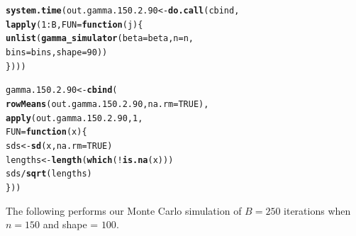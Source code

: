 \documentclass[11pt]{article}\usepackage[]{graphicx}\usepackage[]{color}
\makeatletter
\newcommand{\hlnum}[1]{\textcolor[rgb]{0.686,0.059,0.569}{#1}}%
\newcommand{\hlopt}[1]{\textcolor[rgb]{0,0,0}{#1}}%
\newcommand{\hlstd}[1]{\textcolor[rgb]{0.345,0.345,0.345}{#1}}%
\newcommand{\hlkwa}[1]{\textcolor[rgb]{0.161,0.373,0.58}{\textbf{#1}}}%
\newcommand{\hlkwb}[1]{\textcolor[rgb]{0.69,0.353,0.396}{#1}}%
\newcommand{\hlkwc}[1]{\textcolor[rgb]{0.333,0.667,0.333}{#1}}%
\newcommand{\hlkwd}[1]{\textcolor[rgb]{0.737,0.353,0.396}{\textbf{#1}}}%
\newenvironment{kframe}{%
 \def\at@end@of@kframe{}%
 \ifinner\ifhmode%
  \def\at@end@of@kframe{\end{minipage}}%
  \begin{minipage}{\columnwidth}%
 \fi\fi%
 \def\FrameCommand##1{\hskip\@totalleftmargin \hskip-\fboxsep
 \colorbox{shadecolor}{##1}\hskip-\fboxsep
     \hskip-\linewidth \hskip-\@totalleftmargin \hskip\columnwidth}%
 \MakeFramed {\advance\hsize-\width
   \@totalleftmargin\z@ \linewidth\hsize
   \@setminipage}}%
 {\par\unskip\endMakeFramed%
 \at@end@of@kframe}
\newenvironment{knitrout}{}{} %
\makeatother
\begin{document}
\begin{knitrout}
\color{fgcolor}\begin{kframe}
\begin{alltt}
\hlkwd{system.time}\hlstd{(out.gamma.150.2.90} \hlkwb{<-} \hlkwd{do.call}\hlstd{(cbind,}
  \hlkwd{lapply}\hlstd{(}\hlnum{1}\hlopt{:}\hlstd{B,} \hlkwc{FUN} \hlstd{=} \hlkwa{function}\hlstd{(}\hlkwc{j}\hlstd{)\{}
    \hlkwd{unlist}\hlstd{(}\hlkwd{gamma_simulator}\hlstd{(}\hlkwc{beta} \hlstd{= beta,} \hlkwc{n} \hlstd{= n,}
      \hlkwc{bins} \hlstd{= bins,} \hlkwc{shape} \hlstd{=} \hlnum{90}\hlstd{))}
\hlstd{\})))}
\end{alltt}


{\ttfamily\noindent\bfseries\color{errorcolor}{\#\# Error in eval(family\$initialize): non-positive values not allowed for the 'gamma' family}}

{\ttfamily\noindent\itshape\color{messagecolor}{\#\# Timing stopped at: 0.007 0 0.007}}\end{kframe}
\end{knitrout}

\begin{knitrout}
\color{fgcolor}\begin{kframe}
\begin{alltt}
\hlstd{gamma.150.2.90} \hlkwb{<-} \hlkwd{cbind}\hlstd{(}
  \hlkwd{rowMeans}\hlstd{(out.gamma.150.2.90,} \hlkwc{na.rm} \hlstd{=} \hlnum{TRUE}\hlstd{),}
  \hlkwd{apply}\hlstd{(out.gamma.150.2.90,} \hlnum{1}\hlstd{,}
  \hlkwc{FUN} \hlstd{=} \hlkwa{function}\hlstd{(}\hlkwc{x}\hlstd{)\{}
    \hlstd{sds} \hlkwb{<-} \hlkwd{sd}\hlstd{(x,} \hlkwc{na.rm} \hlstd{=} \hlnum{TRUE}\hlstd{)}
    \hlstd{lengths} \hlkwb{<-} \hlkwd{length}\hlstd{(}\hlkwd{which}\hlstd{(}\hlopt{!}\hlkwd{is.na}\hlstd{(x)))}
    \hlstd{sds} \hlopt{/} \hlkwd{sqrt}\hlstd{(lengths)}
  \hlstd{\}))}
\end{alltt}


{\ttfamily\noindent\bfseries\color{errorcolor}{\#\# Error in is.data.frame(x): object 'out.gamma.150.2.90' not found}}\end{kframe}
\end{knitrout}

The following performs our Monte Carlo simulation of $B = 250$ iterations 
when $n = 150$ and shape = $100$.
\end{document}
